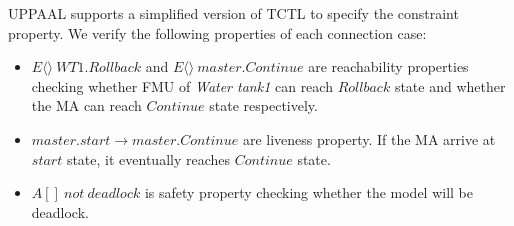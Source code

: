 UPPAAL supports a simplified version of TCTL \cite{BouchenebGR09} to specify the constraint property. We verify the following properties of each connection case:
\begin{itemize}
\item
$E\langle\rangle~WT1.Rollback$ and $E\langle\rangle~master.Continue$ are reachability properties checking whether FMU of \emph{Water tank1} can reach $Rollback$ state and whether the MA can reach $Continue$ state respectively.
\item
$master.start \rightarrow master.Continue$ are liveness property. If the MA arrive at $start$ state, it eventually reaches $Continue$ state.
\item 
$A[]~not~deadlock$ is safety property checking whether the model will be deadlock.
\end{itemize}

